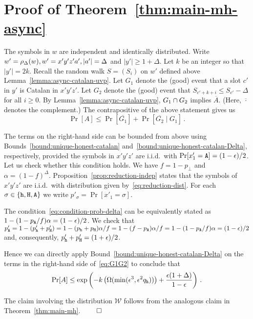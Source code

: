 \section{Proof of Theorem~\ref{thm:main-mh-async}}
  The symbols in $w$ are independent and identically distributed.
  Write 
  $w' = \rho_\Delta(w), w' = x'y'z'a', |a'| = \Delta$ and $|y'| \geq 1+\Delta$. 
  Let $k$ be an integer so that $|y'| = 2k$. 
  Recall the random walk $S = (S_i)$ on $w'$ 
  defined above Lemma~\ref{lemma:async-catalan-uvp}. 
  Let $G_1$ denote the (good) event that 
  a slot $c'$ in $y'$ is Catalan in $x'y'z'$. 
  Let $G_2$ denote the (good) event that 
  $S_{c' + k + i} \leq S_{c'} - \Delta$ for all $i \geq 0$. 
  By Lemma~\ref{lemma:async-catalan-uvp}, 
  $G_1 \cap G_2$ implies $\overline{A}$. 
  (Here, $\overline{\cdot}$ denotes the complement.) 
  The contrapositive of the above statement gives us 
  \begin{equation}\label{eq:G1G2}
    \Pr[A] \leq \Pr[\overline{G_1}] + \Pr[\overline{G_2} \mid G_1]
    \,.
  \end{equation}

  The terms on the right-hand side can be bounded from above 
  using Bounds~\ref{bound:unique-honest-catalan} 
  and~\ref{bound:unique-honest-catalan-Delta}, respectively, 
  provided the symbols in $x'y'z'$ are i.i.d.\ with 
  $\Pr[x'_1 = \mathtt{A}] = (1 - \epsilon)/2$. 
  Let us check whether this condition holds. 
  We have $f = 1 - p_\perp$ and $\alpha = (1-f)^\Delta$. 
  Proposition~\ref{prop:reduction-indep} 
  states that 
  the symbols of $x'y'z'$ are i.i.d.\ 
  with distribution given by~\eqref{eq:reduction-dist}. 
  For each $\sigma \in \{\mathtt{h}, \mathtt{H}, \mathtt{A}\}$ we write 
  $p'_\sigma = \Pr[x'_1 = \sigma]$. 

  The condition~\eqref{eq:condition-prob-delta} 
  can be equivalently stated as 
  $1 - (1 - p_{\mathtt{A}}/f)\alpha = (1 - \epsilon)/2$. 
  We check that 
  $p'_{\mathtt{A}} 
  = 1 - (p'_{\mathtt{h}} + p'_{\mathtt{H}}) 
  = 1 - (p_{\mathtt{h}} + p_{\mathtt{H}})\alpha/f
  = 1 - (f - p_{\mathtt{A}})\alpha/f
  = 1 - (1 - p_{\mathtt{A}}/f)\alpha
  = (1 - \epsilon)/2
  $ 
  and, consequently, $p'_{\mathtt{h}} + p'_{\mathtt{H}} = (1 + \epsilon)/2$. 

  Hence we can directly apply 
  Bound~\ref{bound:unique-honest-catalan-Delta} 
  on the terms in the right-hand side of~\eqref{eq:G1G2} 
  to conclude that 
  \[
    \Pr[A] \leq \exp\left( 
      -k \left(\Omega(\min(\epsilon^3, \epsilon^2 q_{\mathtt{h}})) \right) 
      + 
      \frac{\epsilon(1+\Delta)}{1 - \epsilon} 
    \right)
    \,.
  \]

  The claim involving the distribution $\mathcal{W}$ 
  follows from the analogous claim in Theorem~\ref{thm:main-mh}. 
  \hfill $\qed$  



